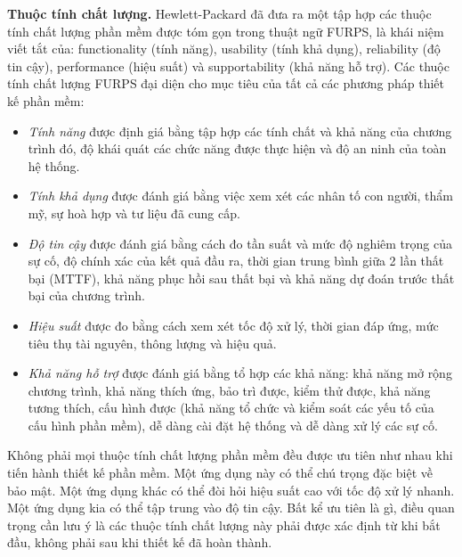 \documentclass[./../SoftwareEngineering.tex]{subfiles}
\begin{document}
	\textbf{Thuộc tính chất lượng.} Hewlett-Packard \cites{Gra87} đã đưa ra một tập hợp các thuộc tính chất lượng phần mềm được tóm gọn trong thuật ngữ \acrshort{FURPS}, là khái niệm viết tắt của: functionality (tính năng), usability (tính khả dụng), reliability (độ tin cậy), performance (hiệu suất) và supportability (khả năng hỗ trợ). Các thuộc tính chất lượng \acrshort{FURPS} đại diện cho mục tiêu của tất cả các phương pháp thiết kế phần mềm:
	\begin{itemize}
		\item \textit{Tính năng} được định giá bằng tập hợp các tính chất và khả năng của chương trình đó, độ khái quát các chức năng được thực hiện và độ an ninh của toàn hệ thống.
		\item \textit{Tính khả dụng} được đánh giá bằng việc xem xét các nhân tố con người, thẩm mỹ, sự hoà hợp và tư liệu đã cung cấp. 
		\item \textit{Độ tin cậy} được đánh giá bằng cách đo tần suất và mức độ nghiêm trọng của sự cố, độ chính xác của kết quả đầu ra, thời gian trung bình giữa 2 lần thất bại (\acrshort{MTTF}), khả năng phục hồi sau thất bại và khả năng dự đoán trước thất bại của chương trình. 
		\item \textit{Hiệu suất} được đo bằng cách xem xét tốc độ xử lý, thời gian đáp ứng, mức tiêu thụ tài nguyên, thông lượng và hiệu quả. 
		\item \textit{Khả năng hỗ trợ} được đánh giá bằng tổ hợp các khả năng: khả năng mở rộng chương trình, khả năng thích ứng, bảo trì được, kiểm thử được, khả năng tương thích, cấu hình được (khả năng tổ chức và kiểm soát các yếu tố của cấu hình phần mềm), dễ dàng cài đặt hệ thống và dễ dàng xử lý các sự cố.
	\end{itemize}
	Không phải mọi thuộc tính chất lượng phần mềm đều được ưu tiên như nhau khi tiến hành thiết kế phần mềm. Một ứng dụng này có thể chú trọng đặc biệt về bảo mật. Một ứng dụng khác có thể đòi hỏi hiệu suất cao với  tốc độ xử lý nhanh. Một ứng dụng kia có thể tập trung vào độ tin cậy. Bất kể ưu tiên là gì, điều quan trọng cần lưu ý là các thuộc tính chất lượng này phải được xác định từ khi bắt đầu, không phải sau khi thiết kế đã  hoàn thành.
\end{document}
